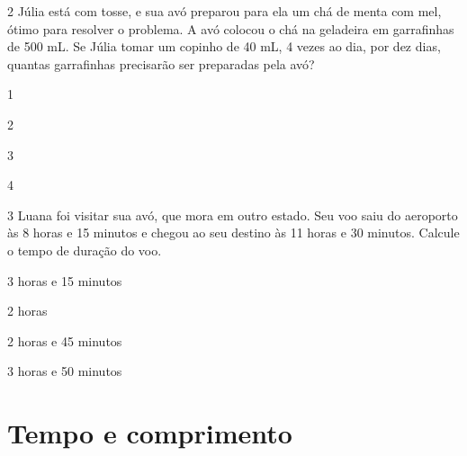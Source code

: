 \num{2} Júlia está com tosse, e sua avó preparou para ela um chá de menta com mel, ótimo para resolver o problema. A avó colocou o chá na geladeira em garrafinhas de 500 mL. Se Júlia tomar um copinho de 40 mL, 4 vezes ao dia, por dez dias, quantas garrafinhas precisarão ser preparadas pela avó?

\begin{escolha}
\begin{multicols}{2}

\item 1

\item 2
\end{multicols}


\begin{multicols}{2}

\item 3

\item 4
\end{multicols}
\end{escolha}


\num{3} Luana foi visitar sua avó, que mora em outro estado. Seu voo
saiu do aeroporto às 8 horas e 15 minutos e chegou ao seu destino às 11
horas e 30 minutos. Calcule o tempo de duração do voo.

\begin{escolha}
\begin{multicols}{2}

\item 3 horas e 15 minutos

\item 2 horas
\end{multicols}


\begin{multicols}{2}

\item 2 horas e 45 minutos

\item 3 horas e 50 minutos
\end{multicols}  
\end{escolha}

\chapter{Tempo e comprimento}
\enlargethispage{6\baselineskip}

